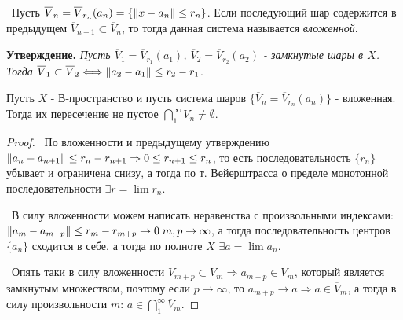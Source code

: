 \noindent \textasteriskcentered~Пусть $\overline{V}_n = \overline{V}_{r_n}(a_n) = \{ \left\lVert x - a_n\right\rVert \le r_n\}$. Если последующий шар содержится в предыдущем
$\overline{V}_{n + 1} \subset \overline{V}_{n}$, то тогда данная система называется \textit{вложенной}.  

\medskip
\noindent \textbf{Утверждение. }\textit{Пусть $\overline{V}_1 = \overline{V}_{r_1}(a_1)$, $\overline{V}_2 = \overline{V}_{r_2}(a_2)$ - замкнутые шары в $X$. Тогда $
\overline{V}_1 \subset \overline{V}_2 \Longleftrightarrow \left\lVert a_2 - a_1\right\rVert \le r_2 - r_1$}. 

\begin{theorem*}
Пусть $X$ - В-пространство и пусть система шаров $\{ \overline{V}_n = \overline{V}_{r_n}(a_n)\}$ - вложенная. Тогда их пересечение не пустое $\bigcap\limits_1^\infty 
\overline{V}_n \neq \emptyset$. 
\end{theorem*}

\begin{proof}
\par\noindent \textbullet~По вложенности и предыдущему утверждению $\left\lVert a_n - a_{n + 1}\right\rVert \le r_n - r_{n + 1} \Rightarrow 0 \le r_{n + 1} \le r_n$, то есть 
последовательность $\{ r_n\}$ убывает и ограничена снизу, а тогда по т. Вейерштрасса о пределе монотонной последовательности $\exists r = \lim r_n$.

\noindent \textbullet~В силу вложенности можем написать неравенства с произвольными индексами: $\left\lVert a_m - a_{m + p}\right\rVert \le r_m - r_{m+p} \to 0 \; m, p \to \infty$, 
а тогда последовательность центров $\{ a_n\}$ сходится в себе, а тогда по полноте $X$ $\exists a = \lim a_n$.

\noindent \textbullet~Опять таки в силу вложенности $\overline{V}_{m + p} \subset \overline{V}_m \Rightarrow a_{m + p} \in \overline{V}_m$, который является замкнутым 
множеством, поэтому если $p \to \infty$, то $a_{m + p} \to a \Rightarrow a \in \overline{V}_m$, а тогда в силу произвольности $m$: $a \in \bigcap\limits_1^\infty 
\overline{V}_m$.
\end{proof}